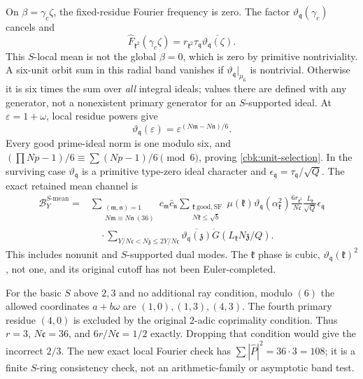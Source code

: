 On $\beta=\gamma_c\zeta$, the fixed-residue Fourier frequency is
zero. The factor $\vartheta_{\mathfrak q}(\gamma_c)$ cancels and
\[
 \widehat F_{\mathfrak k^2}(\gamma_c\zeta)
        =r_{\mathfrak k^2}\tau_{\mathfrak q}
                                  \overline{\vartheta_{\mathfrak q}(\zeta)}.
\]
This $S$-local mean is not the global $\beta=0$, which is zero by
primitive nontriviality. A six-unit orbit sum in this radial band
vanishes if $\vartheta_{\mathfrak q}|_{\mu_6}$ is nontrivial.
Otherwise it is six times the sum over \emph{all} integral ideals;
values there are defined with any generator, not a nonexistent
primary generator for an $S$-supported ideal.
At $\varepsilon=1+\omega$, local residue powers give
\[
 \vartheta_{\mathfrak q}(\varepsilon)
       =\varepsilon^{(N\mathfrak m-N\mathfrak n)/6}.
\]
Every good prime-ideal norm is one modulo six, and
$(\prod Np-1)/6\equiv\sum(Np-1)/6\pmod6$, proving
\eqref{cbk:unit-selection}. In the surviving case
$\vartheta_{\mathfrak q}$ is a primitive type-zero ideal character
and $\epsilon_{\mathfrak q}=\tau_{\mathfrak q}/\sqrt Q$.
The exact retained mean channel is
\begin{equation}\label{cbk:literal-mean}
 \begin{split}
 \mathcal B_Y^{S\text{-mean}}
 ={}&\sum_{\substack{(\mathfrak m,\mathfrak n)=1\\
                    N\mathfrak m\equiv N\mathfrak n\ (36)}}
 c_{\mathfrak m}\bar c_{\mathfrak n}
 \sum_{\substack{\mathfrak k\ \mathrm{good,SF}\\N\mathfrak k\le\sqrt b}}
 \mu(\mathfrak k)\vartheta_{\mathfrak q}(\alpha_{\mathfrak k}^2)
 \frac{6r_{\mathfrak k^2}}{N\mathfrak c}
                         \frac{L_{\mathfrak k}}{\sqrt Q}\epsilon_{\mathfrak q}\\
 &\quad\cdot\sum_{Y/N\mathfrak c<N\mathfrak z\le2Y/N\mathfrak c}
       \overline{\vartheta_{\mathfrak q}(\mathfrak z)}
                                      \dot G(L_{\mathfrak k}N\mathfrak z/Q).
 \end{split}
\end{equation}
This includes nonunit and $S$-supported dual modes. The $\mathfrak k$
phase is cubic, $\vartheta_{\mathfrak q}(\mathfrak k)^2$, not one,
and its original cutoff has not been Euler-completed.

For the basic $S$ above $2,3$ and no additional ray condition,
modulo $(6)$ the allowed coordinates $a+b\omega$ are
$(1,0),(1,3),(4,3)$. The fourth primary residue $(4,0)$ is excluded
by the original $2$-adic coprimality condition. Thus $r=3$,
$N\mathfrak c=36$, and $6r/N\mathfrak c=1/2$ exactly. Dropping that
condition would give the incorrect $2/3$. The new exact local
Fourier check has $\sum|\widehat P|^2=36\cdot3=108$; it is a
finite $S$-ring consistency check, not an arithmetic-family or
asymptotic band test.

